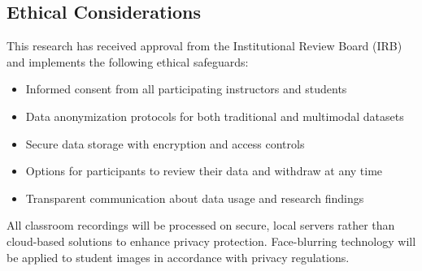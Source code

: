 \subsection{Ethical Considerations}
This research has received approval from the Institutional Review Board (IRB) and implements the following ethical safeguards:
\begin{itemize}
    \item Informed consent from all participating instructors and students
    \item Data anonymization protocols for both traditional and multimodal datasets
    \item Secure data storage with encryption and access controls
    \item Options for participants to review their data and withdraw at any time
    \item Transparent communication about data usage and research findings
\end{itemize}

All classroom recordings will be processed on secure, local servers rather than cloud-based solutions to enhance privacy protection. Face-blurring technology will be applied to student images in accordance with privacy regulations.

